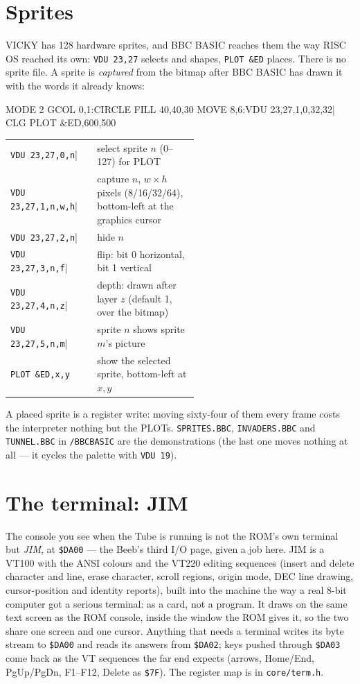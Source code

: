 \section{Sprites}
VICKY has 128 hardware sprites, and BBC BASIC reaches them the way RISC OS
reached its own: \verb|VDU 23,27| selects and shapes, \verb|PLOT &ED|
places. There is no sprite file. A sprite is \emph{captured} from the
bitmap after BBC BASIC has drawn it with the words it already knows:

\begin{type}
MODE 2
GCOL 0,1:CIRCLE FILL 40,40,30
MOVE 8,6:VDU 23,27,1,0,32,32|
CLG
PLOT &ED,600,500
\end{type}

\small
\begin{tabular}{@{}l >{\raggedright\arraybackslash}p{0.54\linewidth}@{}}
\verb|VDU 23,27,0,n|| & select sprite $n$ (0--127) for PLOT \\
\verb|VDU 23,27,1,n,w,h|| & capture $n$, $w\times h$ pixels (8/16/32/64), bottom-left at the graphics cursor \\
\verb|VDU 23,27,2,n|| & hide $n$ \\
\verb|VDU 23,27,3,n,f|| & flip: bit 0 horizontal, bit 1 vertical \\
\verb|VDU 23,27,4,n,z|| & depth: drawn after layer $z$ (default 1, over the bitmap) \\
\verb|VDU 23,27,5,n,m|| & sprite $n$ shows sprite $m$'s picture \\
\verb|PLOT &ED,x,y| & show the selected sprite, bottom-left at $x,y$ \\
\end{tabular}
\normalsize

A placed sprite is a register write: moving sixty-four of them every frame
costs the interpreter nothing but the PLOTs. \texttt{SPRITES.BBC},
\texttt{INVADERS.BBC} and \texttt{TUNNEL.BBC} in \texttt{/BBCBASIC} are
the demonstrations (the last one moves nothing at all --- it cycles the
palette with \verb|VDU 19|).

\section{The terminal: JIM}
The console you see when the Tube is running is not the ROM's own terminal
but \emph{JIM}, at \texttt{\$DA00} --- the Beeb's third I/O page, given a
job here. JIM is a VT100 with the ANSI colours and the VT220 editing
sequences (insert and delete character and line, erase character, scroll
regions, origin mode, DEC line drawing, cursor-position and identity
reports), built into the machine the way a real 8-bit computer got a
serious terminal: as a card, not a program. It draws on the same text
screen as the ROM console, inside the window the ROM gives it, so the two
share one screen and one cursor. Anything that needs a terminal writes its
byte stream to \texttt{\$DA00} and reads its answers from \texttt{\$DA02};
keys pushed through \texttt{\$DA03} come back as the VT sequences the far
end expects (arrows, Home/End, PgUp/PgDn, F1--F12, Delete as \texttt{\$7F}).
The register map is in \texttt{core/term.h}.

